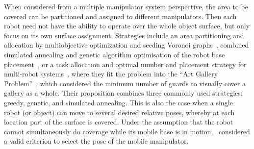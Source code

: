 \documentclass[letterpaper,journal]{IEEEtran}
\begin{document}
When considered from a multiple manipulator system perspective, the area to be covered can be partitioned and assigned to different manipulators. 
Then each robot need not have the ability to operate over the whole object surface, but only focus on its own surface assignment. Strategies include
an area partitioning and allocation by multiobjective optimization and seeding Voronoi graphs~\cite{Hassan2014Task}, combined simulated annealing and genetic algorithm optimisation of the robot base placement~\cite{Hassan2016Modelling}, or a task allocation and optimal number and placement strategy for multi-robot systems~\cite{Kalawoun2018Optimal}, where they fit the problem into the ``Art Gallery Problem''~\cite{Kahn2006Traditional},  which considered the minimum number of guards to visually cover a gallery as a whole. Their proposition combines three commonly used strategies: greedy, genetic, and simulated annealing. 
This is also the case when a single robot (or object) can move to several desired relative poses, whereby at each location part of the surface is covered. Under the assumption that the robot cannot simultaneously do coverage while its mobile base is in motion,~\cite{paus2017a} considered a valid criterion to select the pose of the mobile manipulator. 
\end{document}
